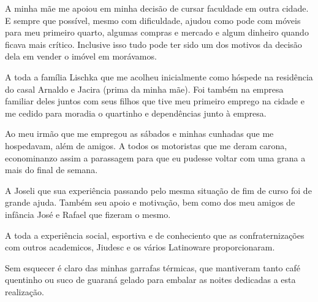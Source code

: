
A minha mãe me apoiou em minha decisão de cursar faculdade em outra cidade. E
sempre que possível, mesmo com dificuldade, ajudou como pode com móveis para meu
primeiro quarto, algumas compras e mercado e algum dinheiro quando ficava mais
crítico. Inclusive isso tudo pode ter sido um dos motivos da decisão dela em
vender o imóvel em morávamos.

A toda a família Lischka que me acolheu inicialmente como hóspede na residência
do casal Arnaldo e Jacira (prima da minha mãe). Foi também na empresa familiar
deles juntos com seus filhos que tive meu primeiro emprego na cidade e me cedido
para moradia o quartinho e dependências junto à empresa.

Ao meu irmão que me empregou as sábados e minhas cunhadas que me hospedavam, além de amigos. A todos os motoristas que me deram carona, econominanzo assim a parassagem para que eu pudesse voltar com uma grana a mais do final de semana.

A Joseli que sua experiência passando pelo mesma situação de fim de curso foi de grande ajuda. Também seu apoio e motivação, bem como dos meu amigos de infância José e Rafael que fizeram o mesmo.

A toda a experiência social, esportiva e de conheciento que as confraternizações com outros academicos, Jiudesc e os vários Latinoware proporcionaram.

Sem esquecer é claro das minhas garrafas térmicas, que mantiveram tanto café quentinho ou suco de guaraná gelado para embalar as noites dedicadas a esta realização.
